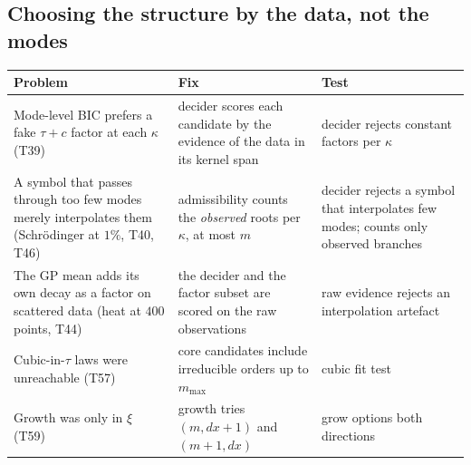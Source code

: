 \documentclass[11pt,a4paper]{article}
\theoremstyle{definition}
\begin{document}
\subsection{Choosing the structure by the data, not the modes}
\begin{center}\small
\begin{tabular}{@{}L{4.1cm}L{4.4cm}L{4.4cm}@{}}
\toprule
Problem & Fix & Test\\\midrule
Mode-level BIC prefers a fake $\tau+c$ factor at each $\kappa$ (T39) & decider scores each candidate by the evidence of the data in its kernel span & decider rejects constant factors per $\kappa$\\
A symbol that passes through too few modes merely interpolates them (Schr\"odinger at $1\%$, T40, T46) & admissibility counts the \emph{observed} roots per $\kappa$, at most $m$ & decider rejects a symbol that interpolates few modes; counts only observed branches\\
The GP mean adds its own decay as a factor on scattered data (heat at $400$ points, T44) & the decider and the factor subset are scored on the raw observations & raw evidence rejects an interpolation artefact\\
Cubic-in-$\tau$ laws were unreachable (T57) & core candidates include irreducible orders up to $m_{\max}$ & cubic fit test\\
Growth was only in $\xi$ (T59) & growth tries $(m,dx+1)$ and $(m+1,dx)$ & grow options both directions\\
\bottomrule
\end{tabular}
\end{center}
\end{document}
